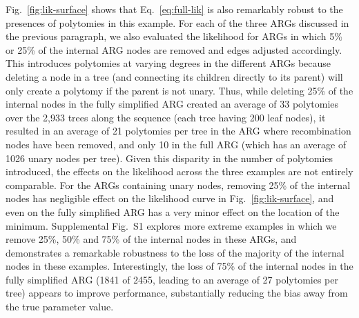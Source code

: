 \documentclass{article}
\begin{document}
Fig.~\ref{fig:lik-surface} shows that Eq.~\eqref{eq:full-lik} is also remarkably 
robust to the presences of polytomies in this example. For each of the three
ARGs discussed in the previous paragraph, we also evaluated the likelihood
for ARGs in which 5\% or 25\% of the internal ARG nodes are removed and
edges adjusted accordingly.
This introduces polytomies at varying degrees in the different ARGs because
deleting a node in a tree (and connecting its children directly to its
parent) will only create a polytomy if the parent
is not unary. Thus, while deleting 25\% of the internal nodes
in the fully simplified ARG created an average of 33 polytomies
over the 2,933 trees along the sequence (each tree having
200 leaf nodes), it resulted in an average of 21 polytomies
per tree in the ARG where recombination nodes have been removed,
and only 10 in the full ARG (which has an average of 1026 unary
nodes per tree).
Given this disparity in the number of polytomies introduced, the
effects on the likelihood across the three examples are not entirely comparable.
For the ARGs containing unary nodes,
removing 25\% of the internal
nodes has negligible effect on the likelihood curve in Fig.~\ref{fig:lik-surface},
and even on the fully simplified
ARG has a very minor effect on the location of the minimum.
Supplemental Fig.~S1 explores more extreme examples in which we remove
25\%, 50\% and 75\% of the internal nodes in these ARGs, and demonstrates 
a remarkable robustness to the loss of the majority of the internal
nodes in these examples. Interestingly, the loss of 75\% of the 
internal nodes  in the fully simplified ARG 
(1841 of 2455, leading  to an average of 27 polytomies per tree)
appears to improve performance, substantially 
reducing the bias away from the true parameter value. 
\end{document}
